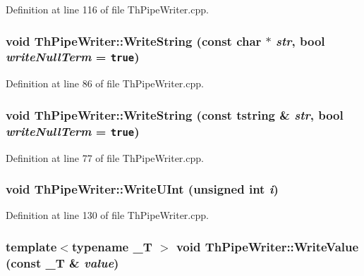 Definition at line 116 of file ThPipeWriter.cpp.\hypertarget{class_th_pipe_writer_4b3772d0c7fa0f06add7ea34f80c6aaa}{
\subsubsection[{WriteString}]{\setlength{\rightskip}{0pt plus 5cm}void ThPipeWriter::WriteString (const char $\ast$ {\em str}, \/  bool {\em writeNullTerm} = {\tt true})}}
\label{class_th_pipe_writer_4b3772d0c7fa0f06add7ea34f80c6aaa}




Definition at line 86 of file ThPipeWriter.cpp.\hypertarget{class_th_pipe_writer_8051b8a2b7f9482c97bdfed67103ed30}{
\subsubsection[{WriteString}]{\setlength{\rightskip}{0pt plus 5cm}void ThPipeWriter::WriteString (const {\bf tstring} \& {\em str}, \/  bool {\em writeNullTerm} = {\tt true})}}
\label{class_th_pipe_writer_8051b8a2b7f9482c97bdfed67103ed30}




Definition at line 77 of file ThPipeWriter.cpp.\hypertarget{class_th_pipe_writer_49f904b80a2b51d00d6e9f892d41575e}{
\subsubsection[{WriteUInt}]{\setlength{\rightskip}{0pt plus 5cm}void ThPipeWriter::WriteUInt (unsigned int {\em i})}}
\label{class_th_pipe_writer_49f904b80a2b51d00d6e9f892d41575e}




Definition at line 130 of file ThPipeWriter.cpp.\hypertarget{class_th_pipe_writer_dd6200799026cc86186a2e400fbe297c}{
\subsubsection[{WriteValue}]{\setlength{\rightskip}{0pt plus 5cm}template$<$typename \_\-T $>$ void ThPipeWriter::WriteValue (const \_\-T \& {\em value})}}
\label{class_th_pipe_writer_dd6200799026cc86186a2e400fbe297c}




